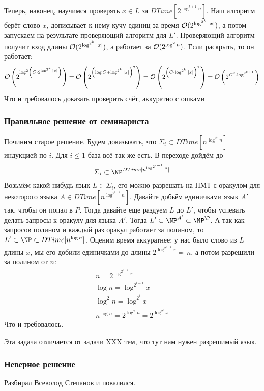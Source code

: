 		Теперь, наконец, научимся проверять $x \in L$ за $DTime[2^{\log^{k+1} n}]$.
		Наш алгоритм берёт слово $x$, дописывает к нему кучу единиц за время $\mathcal O(2^{\log^{2^k} |x|})$,
		а потом запускаем на результате проверяющий алгоритм для $L'$.
		Проверяющий алгоритм получит вход длины $\mathcal O(2^{\log^{2^k} |x|})$, а работает
		за $\mathcal O(2^{\log^2 n})$.
		Если раскрыть, то он работает:
		\[
			\mathcal O\left(2^{\log^2 \left(C \cdot 2^{\log^{2^k} |x|}\right) }\right) =
			\mathcal O\left(2^{\left(\log C + \log^{2^k} |x|\right)^2}\right) =
			\mathcal O\left(2^{\left(C \cdot \log^{2^k} |x|\right)^2}\right) =
			\mathcal O\left(2^{C^2 \cdot \log^{2^{k+1}}}\right)
		\]
		Что и требовалось доказать
		\TODO проверить счёт, аккуратно с ошками

	\subsubsection{Правильное решение от семинариста}
		Починим старое решение.
		Будем доказывать, что $\Sigma_i \subset DTime[n^{\log^{2^i} n}]$ индукцией по $i$.
		Для $i \le 1$ база всё так же есть.
		В переходе дойдём до
		\[ \Sigma_i \subset \NP^{DTime[n^{\log^{2^{i-1}} n}]} \]
		Возьмём какой-нибудь язык $L\in\Sigma_i$, его можно разрешать на НМТ
		с оракулом для некоторого языка $A \in DTime[n^{\log^{2^{i-1}} n}]$.
		Давайте добьём единичками язык $A'$ так, чтобы он попал в $P$.
		Тогда давайте еще раздуем $L$ до $L'$, чтобы успевать делать запросы к оракулу
		для языка $A'$.
		Тогда $L' \subset \NP^{A'} \subset \NP^\P$.
		А так как запросов полином и каждый раз оракул работает за полином, то $L' \subset \NP \subset DTime[n^{\log n}]$.
		Оценим время аккуратнее: у нас было слово из $L$ длины $x$,
		мы его добили единичками до длины $2^{\log^{2^{i-1}} x} \eqcolon n$, а потом разрешили за полином от $n$:
		\begin{gather*}
			n = 2^{\log^{2^{i-1}} x} \\
			\log n = \log^{2^{i-1}} x \\
			\log^2 n = \log^{2^i} x \\
			n^{\log n} = 2^{\log^2n} = 2^{\log^{2^i} x}
		\end{gather*}
		Что и требовалось.

	Эта задача отличается от задачи XXX тем, что тут нам нужен разрешимый язык.
	\subsubsection{Неверное решение}
		Разбирал Всеволод Степанов и повалился.

